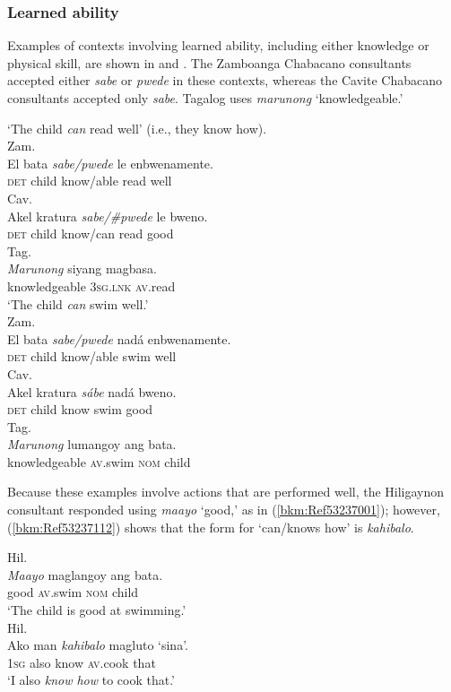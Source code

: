 \documentclass[output=paper,colorlinks,citecolor=brown]{langscibook}
\begin{document}
\subsubsection{Learned ability}


Examples of contexts involving learned ability, including either knowledge or physical skill, are shown in  and . The Zamboanga Chabacano consultants accepted either \textit{sabe} or \textit{pwede} in these contexts, whereas the Cavite Chabacano consultants accepted only \textit{sabe}. Tagalog uses \textit{marunong} ‘knowledgeable.’

\ea \label{ex:lesho:15}
{‘The child \textit{can} read well’ (i.e., they know how).}\\
\ea
{Zam.}\\
\gll El bata \textit{sabe/pwede} le enbwenamente.\\
     \textsc{det} child know/able read well\\
\ex
{Cav.}\\
\gll Akel kratura \textit{sabe/\#pwede} le bweno.\\
     \textsc{det} child know/can read good\\
\ex
{Tag.}\\
\gll \textit{Marunong} siyang magbasa.\\
     knowledgeable 3\textsc{sg.lnk} \textsc{av}.read\\
\z
\ex\label{ex:lesho:16}
{‘The child \textit{can} swim well.’}\\
\ea
{Zam.}\\
\gll El bata \textit{sabe/pwede} nadá enbwenamente.\\
     \textsc{det} child know/able swim well\\
\ex
{Cav.}\\
\gll Akel kratura \textit{sábe} nadá bweno.\\
     \textsc{det} child know swim good\\
\ex
{Tag.}\\
\gll \textit{Marunong} lumangoy ang bata.\\
knowledgeable \textsc{av}.swim \textsc{nom} child\\
\z
\z

Because these examples involve actions that are performed well, the Hiligaynon consultant responded using \textit{maayo} ‘good,’ as in (\ref{bkm:Ref53237001}); however, (\ref{bkm:Ref53237112}) shows that the form for ‘can/knows how’ is \textit{kahibalo}. 

\ea
{\label{bkm:Ref53237001}Hil.}\\
\gll \textit{Maayo} maglangoy ang bata.\\
       good \textsc{av}.swim \textsc{nom} child\\
\glt `The child is good at swimming.'\\
\ex
{\label{bkm:Ref53237112}Hil.}\\
\gll Ako man \textit{kahibalo} magluto ‘sina'.\\
       1\textsc{sg} also know \textsc{av}.cook that\\
\glt `I also \textit{know how} to cook that.' \citep[53]{Wolfenden1971}\\
\z
\end{document}
